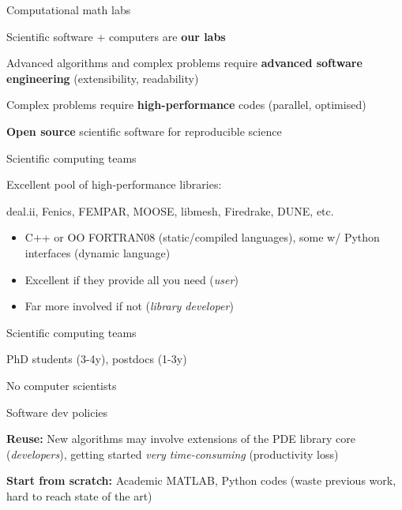 \begin{frame}{Computational math labs}

Scientific software + computers are \textbf{our labs}


Advanced algorithms and complex problems require \textbf{advanced software engineering} (extensibility, readability)

Complex problems require \textbf{high-performance} codes (parallel, optimised)

\textbf{Open source} scientific software for reproducible science

\end{frame}

%
%
%
%
%
%


\begin{frame}{Scientific computing teams}

Excellent pool of high-performance libraries:

deal.ii, Fenics, FEMPAR, MOOSE, libmesh, Firedrake, DUNE, etc.

\begin{itemize}

  \item  C++ or OO FORTRAN08 (static/compiled languages), some w/ Python interfaces (dynamic language)

  \item Excellent if they provide all you need (\emph{user})

  \item  Far more involved if not (\emph{library developer})

\end{itemize}

\end{frame}

\begin{frame}{Scientific computing teams}

PhD students (3-4y), postdocs (1-3y)

No computer scientists

\begin{block}{Software dev policies}

  \textbf{Reuse:} New algorithms may involve extensions of the PDE library core (\emph{developers}), getting started \emph{very time-consuming} (productivity loss)

  \textbf{Start from scratch:} Academic MATLAB, Python codes (waste previous work, hard to reach state of the art)

\end{block}

\end{frame}


